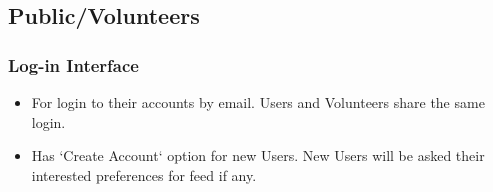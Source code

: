 \documentclass[titlepage,12pt]{article}
\begin{document}
\subsection{Public/Volunteers}
\subsubsection{Log-in Interface}
\begin{itemize}
 \setlength\itemsep{0.3em}
    \item For login to their accounts by email. Users and Volunteers share the same login.
\item Has `Create Account` option for new Users. New Users will be asked their interested preferences for feed if any.
\end{itemize}
\end{document}
